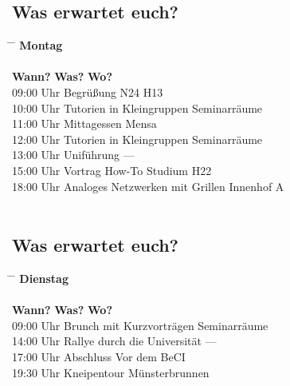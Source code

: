 \documentclass[
	aspectratio=169, %
	11pt %
]{beamer}
\begin{document}
\subsection{Was erwartet euch?}
\begin{frame}{\insertsubsection}
	\begin{tabbing}
		\hspace*{2cm} \= \hspace*{6cm} \= \kill
		\Large\textbf{Montag} \\
		\\
		\textbf{Wann?} \> \textbf{Was?} \> \textbf{Wo?} \\
		09:00 Uhr \> Begrüßung \> N24 H13 \\
		10:00 Uhr \> Tutorien in Kleingruppen \> Seminarräume \\
		11:00 Uhr \> Mittagessen \> Mensa \\
		12:00 Uhr \> Tutorien in Kleingruppen \> Seminarräume \\
		13:00 Uhr \> Uniführung \> --- \\
		15:00 Uhr \> Vortrag How-To Studium \> H22 \\
		18:00 Uhr \> Analoges Netzwerken mit Grillen \> Innenhof A \\
		\\
	\end{tabbing}
\end{frame}

\subsection{Was erwartet euch?}
\begin{frame}{\insertsubsection}
	\begin{tabbing}
		\hspace*{2cm} \= \hspace*{6cm} \= \kill
		\Large\textbf{Dienstag} \\
		\\
		\textbf{Wann?} \> \textbf{Was?} \> \textbf{Wo?} \\
		09:00 Uhr \> Brunch mit Kurzvorträgen \> Seminarräume \\
		14:00 Uhr \> Rallye durch die Universität \> --- \\
		17:00 Uhr \> Abschluss \> Vor dem BeCI \\
		19:30 Uhr \> Kneipentour \> Münsterbrunnen \\
	\end{tabbing}
\end{frame}
\end{document}
